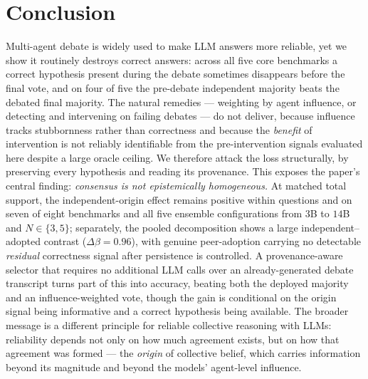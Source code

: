 \section{Conclusion}
\label{sec:conclusion}
Multi-agent debate is widely used to make LLM answers more reliable, yet we show it routinely destroys
correct answers: across all five core benchmarks a correct hypothesis present during the debate sometimes
disappears before the final vote, and on four of five the pre-debate independent majority beats the debated
final majority. The natural remedies ---
weighting by agent influence, or detecting and intervening on failing debates --- do not deliver, because
influence tracks stubbornness rather than correctness and because the \emph{benefit} of intervention is not
reliably identifiable from the pre-intervention signals evaluated here despite a large oracle ceiling. We therefore attack the loss
structurally, by preserving every hypothesis and reading its provenance. This exposes the paper's central
finding: \emph{consensus is not epistemically homogeneous.} At matched total support, the independent-origin
effect remains positive within questions and on seven of eight benchmarks and all five ensemble
configurations from $3$B to $14$B and $N\in\{3,5\}$; separately, the pooled decomposition shows a large
independent--adopted contrast ($\Delta\beta=0.96$), with genuine peer-adoption carrying no detectable
\emph{residual} correctness signal after persistence is controlled. A provenance-aware selector that requires
no additional LLM calls over an already-generated debate transcript turns part of this into accuracy, beating both the
deployed majority and an influence-weighted vote, though the gain is conditional on the origin signal being
informative and a correct hypothesis being available. The broader message is a different principle for
reliable collective reasoning with LLMs: reliability depends not only on how much agreement exists, but on
how that agreement was formed --- the \emph{origin} of collective belief, which carries information beyond
its magnitude and beyond the models' agent-level influence.

\appendix

